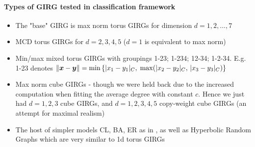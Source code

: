 

\paragraph{Types of GIRG tested in classification framework}
\begin{itemize}
    \item The "base" GIRG is max norm torus GIRGs for dimension $d=1,2,...,7$
    \item MCD torus GIRGs for $d=2,3,4,5$ ($d=1$ is equivalent to max norm)
    \item Min/max mixed torus GIRGs with groupings 1-23; 1-234; 12-34; 1-2-34. E.g. 1-23 denotes $\left\lVert \bm{x} - \bm{y}\right\rVert = \min \left \{ |x_1 - y_1|_C,\; \max(|x_2 - y_2|_C,\, |x_3 - y_3|_C) \right \}$
    \item Max norm cube GIRGs - though we were held back due to the increased computation when fitting the average degree with constant $c$. Hence we just had $d=1,2,3$ cube GIRGs, and $d=1,2,3,4,5$ copy-weight cube GIRGs (an attempt for maximal realism)
    \item The host of simpler models CL, BA, ER as in \cite{blasius2018towards}, as well as Hyperbolic Random Graphs which are very similar to 1d torus GIRGs
\end{itemize}

